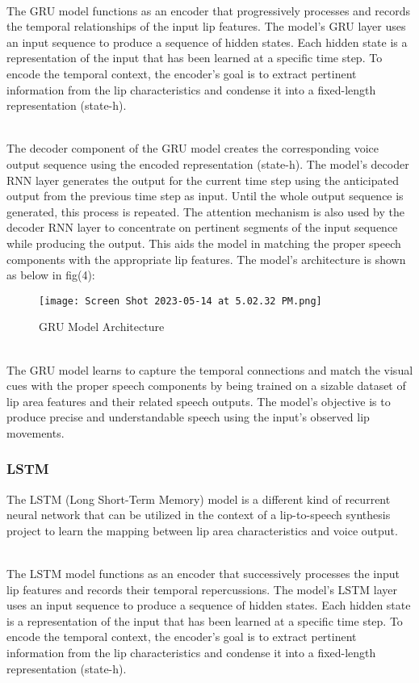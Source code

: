 \documentclass[conference]{IEEEtran}
\begin{document}
\\ The GRU model functions as an encoder that progressively processes and records the temporal relationships of the input lip features. The model's GRU layer uses an input sequence to produce a sequence of hidden states. Each hidden state is a representation of the input that has been learned at a specific time step. To encode the temporal context, the encoder's goal is to extract pertinent information from the lip characteristics and condense it into a fixed-length representation (state-h).

\\ The decoder component of the GRU model creates the corresponding voice output sequence using the encoded representation (state-h). The model's decoder RNN layer generates the output for the current time step using the anticipated output from the previous time step as input. Until the whole output sequence is generated, this process is repeated. The attention mechanism is also used by the decoder RNN layer to concentrate on pertinent segments of the input sequence while producing the output. This aids the model in matching the proper speech components with the appropriate lip features. The model's architecture is shown as below in fig(4):
\begin{figure}[htbp]
\centerline{\texttt{[image: Screen Shot 2023-05-14 at 5.02.32 PM.png]}}
\caption{GRU Model Architecture}
\label{fig}
\end{figure}
\\ The GRU model learns to capture the temporal connections and match the visual cues with the proper speech components by being trained on a sizable dataset of lip area features and their related speech outputs. The model's objective is to produce precise and understandable speech using the input's observed lip movements.
\subsubsection{LSTM}
The LSTM (Long Short-Term Memory) model is a different kind of recurrent neural network that can be utilized in the context of a lip-to-speech synthesis project to learn the mapping between lip area characteristics and voice output.

\\ The LSTM model functions as an encoder that successively processes the input lip features and records their temporal repercussions. The model's LSTM layer uses an input sequence to produce a sequence of hidden states. Each hidden state is a representation of the input that has been learned at a specific time step. To encode the temporal context, the encoder's goal is to extract pertinent information from the lip characteristics and condense it into a fixed-length representation (state-h).
\end{document}
